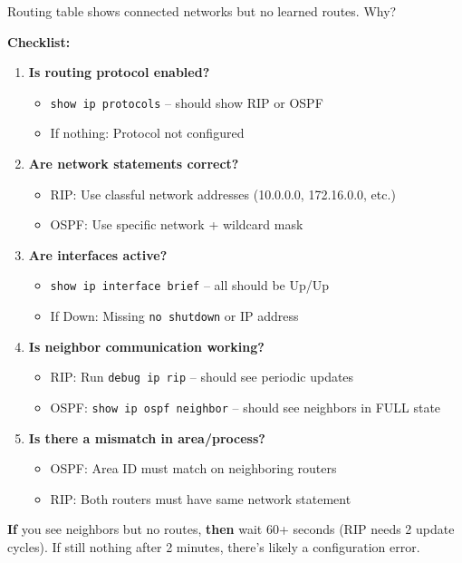 \documentclass[12pt,a4paper]{article}
\begin{document}

\begin{qbox}{Routing table shows connected networks but no learned routes. Why?}
\end{qbox}

\begin{abox}
\textbf{Checklist:}

\begin{enumerate}
    \item \textbf{Is routing protocol enabled?}
    \begin{itemize}
        \item \texttt{show ip protocols} -- should show RIP or OSPF
        \item If nothing: Protocol not configured
    \end{itemize}

    \item \textbf{Are network statements correct?}
    \begin{itemize}
        \item RIP: Use classful network addresses (10.0.0.0, 172.16.0.0, etc.)
        \item OSPF: Use specific network + wildcard mask
    \end{itemize}

    \item \textbf{Are interfaces active?}
    \begin{itemize}
        \item \texttt{show ip interface brief} -- all should be Up/Up
        \item If Down: Missing \texttt{no shutdown} or IP address
    \end{itemize}

    \item \textbf{Is neighbor communication working?}
    \begin{itemize}
        \item RIP: Run \texttt{debug ip rip} -- should see periodic updates
        \item OSPF: \texttt{show ip ospf neighbor} -- should see neighbors in FULL state
    \end{itemize}

    \item \textbf{Is there a mismatch in area/process?}
    \begin{itemize}
        \item OSPF: Area ID must match on neighboring routers
        \item RIP: Both routers must have same network statement
    \end{itemize}
\end{enumerate}

\textbf{If} you see neighbors but no routes, \textbf{then} wait 60+ seconds (RIP needs 2 update cycles). If still nothing after 2 minutes, there's likely a configuration error.
\end{abox}
\end{document}
